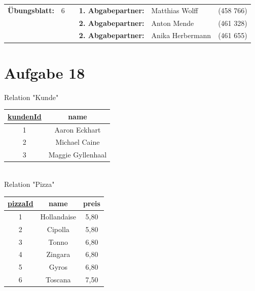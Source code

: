 \newcommand{\obenlinks}{Software Engineering}		%

\usepackage{float}


	\begin{center}
		\begin{tabular}{|rlp{4cm}rll|}
		\hline
		 \textbf{Übungsblatt:} & 6 &   & \textbf{1. Abgabepartner:} & Matthias Wolff & (458 766)  \\
		        & & & \textbf{2. Abgabepartner:} & Anton Mende & (461 328) \\
		        & & & \textbf{2. Abgabepartner:} & Anika Herbermann & (461 655) \\ \hline
		\end{tabular}
	\end{center}




\section*{Aufgabe 18}
Relation "Kunde"\\
\begin{tabular} {|c|c|}
\rowcolor{Gray}\hline
\underline{kundenId} \phantom{a}&name\\\hline
1&Aaron Eckhart\\\hline
2&Michael Caine\\\hline
3&Maggie Gyllenhaal\\\hline
\end{tabular}\\

Relation "Pizza"\\
\begin{tabular} {|c|c|c|}
	\rowcolor{Gray}\hline
	\underline{pizzaId}&name&preis\\\hline
	1&Hollandaise&5,80\\\hline
	2&Cipolla&5,80\\\hline
	3&Tonno&6,80\\\hline
	4&Zingara&6,80\\\hline
	5&Gyros&6,80\\\hline
	6&Toscana&7,50\\\hline
\end{tabular}\\


